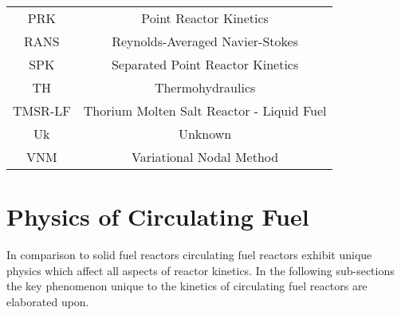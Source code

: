 \documentclass[review]{elsarticle}
\begin{document}
\begin{table}[h]
\begin{center}
\begin{tabular}{|c c|}
            PRK & Point Reactor Kinetics \\
            RANS & Reynolds-Averaged Navier-Stokes \\
            SPK & Separated Point Reactor Kinetics \\
            TH & Thermohydraulics \\
            TMSR-LF & Thorium Molten Salt Reactor - Liquid Fuel \\
            Uk & Unknown \\
            VNM & Variational Nodal Method \\
            \hline
        \end{tabular}
    \end{center}
\end{table}

\section{Physics of Circulating Fuel} \label{sec:physics}
In comparison to solid fuel reactors circulating fuel reactors exhibit unique
physics which affect all aspects of reactor kinetics. In the following
sub-sections the key phenomenon unique to the kinetics of circulating fuel
reactors are elaborated upon.
\end{document}
